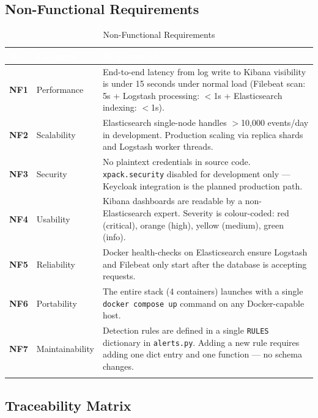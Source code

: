 \documentclass[12pt,a4paper]{article}
\newcommand{\file}[1]{\texttt{\color{accent}#1}}
\newcommand{\field}[1]{\texttt{#1}}
\begin{document}
\subsection{Non-Functional Requirements}

\begin{longtable}{>{\bfseries\small}p{0.8cm} >{\small}p{3cm} >{\small}p{9.5cm}}
  \toprule
  \rowcolor{tabhead}
  \textcolor{white}{\textbf{ID}} &
  \textcolor{white}{\textbf{Category}} &
  \textcolor{white}{\textbf{Requirement}} \\
  \midrule\endhead
  NF1 & Performance &
    End-to-end latency from log write to Kibana visibility is under 15 seconds
    under normal load (Filebeat scan: 5s + Logstash processing: $<$1s +
    Elasticsearch indexing: $<$1s). \\
  \rowcolor{rowalt}
  NF2 & Scalability &
    Elasticsearch single-node handles $>$10,000 events/day in development.
    Production scaling via replica shards and Logstash worker threads. \\
  NF3 & Security &
    No plaintext credentials in source code. \texttt{xpack.security} disabled
    for development only — Keycloak integration is the planned production path. \\
  \rowcolor{rowalt}
  NF4 & Usability &
    Kibana dashboards are readable by a non-Elasticsearch expert. Severity is
    colour-coded: red (critical), orange (high), yellow (medium), green (info). \\
  NF5 & Reliability &
    Docker health-checks on Elasticsearch ensure Logstash and Filebeat only
    start after the database is accepting requests. \\
  \rowcolor{rowalt}
  NF6 & Portability &
    The entire stack (4 containers) launches with a single
    \texttt{docker compose up} command on any Docker-capable host. \\
  NF7 & Maintainability &
    Detection rules are defined in a single \field{RULES} dictionary in
    \file{alerts.py}. Adding a new rule requires adding one dict entry and
    one function — no schema changes. \\
  \bottomrule
  \caption{Non-Functional Requirements}
\end{longtable}

\subsection{Traceability Matrix}
\end{document}
